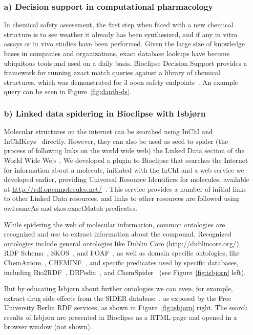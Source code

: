 \documentclass[10pt]{bmc_article}
\newenvironment{bmcformat}{\fussy\setboolean{publ}{true}}{\fussy}
\begin{document}
\begin{bmcformat}
\subsubsection*{a) Decision support in computational pharmacology}
In chemical safety assessment, the first step when faced with a new chemical structure is to see weather it already has been synthesized, and if any in vitro assays or in vivo studies have been performed. Given the large size of knowledge bases in companies and organizations, exact database lookups have become ubiquitous tools and used on a daily basis. Bioclipse Decision Support provides a framework for running exact match queries against a library of chemical structures, which was demonstrated for 3 open safety endpoints~\cite{Spjuth:2011qf}. An example query can be seen in Figure~\ref{fig:danth-ds}.


\subsubsection*{b) Linked data spidering in Bioclipse with Isbjørn}

Molecular structures on the internet can be searched using InChI and InChIKeys~\cite{Coles2005} directly.
However, they can also be used as seed to spider (the process of following links on the world wide web)
the Linked Data section of the World Wide Web~\cite{Samwald2011}. We developed a plugin to Bioclipse
that searches the Internet for information about a molecule, initiated with the InChI and a web service
we developed earlier, providing Universal Resource Identifiers for molecules, available
at \url{http://rdf.openmolecules.net/}~\cite{Willighagen2011}. This
service provides a number of initial links to other Linked Data resources, and links to other
resources are followed using owl:sameAs and skos:exactMatch predicates.

While spidering the web of molecular information, common ontologies are recognized and use to extract
information about the compound. Recognized ontologies include general ontologies like
Dublin Core (\url{http://dublincore.org/}), RDF Schema~\cite{Guha:04:RVD}, SKOS~\cite{Bechhofer:09:SSK},
and FOAF~\cite{Grav07}, as well as domain specific ontologies, like
ChemAxiom~\cite{Adams2009}, CHEMINF~\cite{Hastings2011}, and specific predicates
used by specific databases, including Bio2RDF~\cite{Belleau2008}, DBPedia~\cite{DBPEDIA},
and ChemSpider~\cite{Pence2010} (see Figure~\ref{fig:isbjorn} left).

But by educating Isbjørn about further ontologies we can even, for example, extract drug side effects
from the SIDER database~\cite{Kuhn2010}, as exposed by the Free University Berlin RDF services,
as shown in Figure~\ref{fig:isbjorn} right. The search results of Isbjørn are presented in Bioclipse
as a HTML page and opened in a browser window (not shown).


\end{bmcformat}
\end{document}
